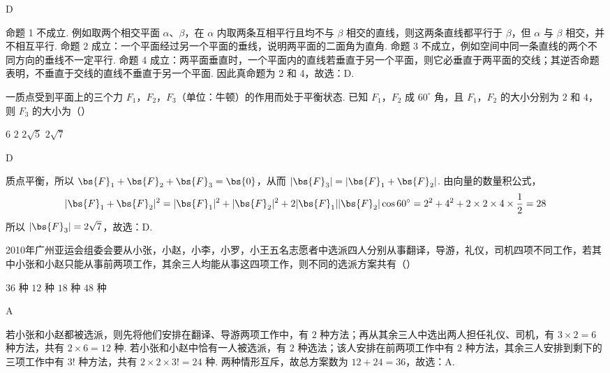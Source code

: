 \begin{answer}
D
\end{answer}

\begin{solution}
命题 1 不成立. 例如取两个相交平面 \(\alpha\)、\(\beta\)，在 \(\alpha\) 内取两条互相平行且均不与 \(\beta\) 相交的直线，则这两条直线都平行于 \(\beta\)，但 \(\alpha\) 与 \(\beta\) 相交，并不相互平行. 命题 2 成立：一个平面经过另一个平面的垂线，说明两平面的二面角为直角. 命题 3 不成立，例如空间中同一条直线的两个不同方向的垂线不一定平行. 命题 4 成立：两平面垂直时，一个平面内的直线若垂直于另一个平面，则它必垂直于两平面的交线；其逆否命题表明，不垂直于交线的直线不垂直于另一个平面. 因此真命题为 2 和 4，故选：D.
\end{solution}

\begin{problem}
一质点受到平面上的三个力 \(F_1\)，\(F_2\)，\(F_3\)（单位：牛顿）的作用而处于平衡状态. 已知 \(F_1\)，\(F_2\) 成 \(60^{\circ}\) 角，且 \(F_1\)，\(F_2\) 的大小分别为 \(2\) 和 \(4\)，则 \(F_3\) 的大小为（\quad）

\choices
    {\(6\)}
    {\(2\)}
    {\(2\sqrt{5}\)}
    {\(2\sqrt{7}\)}
\end{problem}

\begin{answer}
D
\end{answer}

\begin{solution}
质点平衡，所以 \(\bs{F}_1+\bs{F}_2+\bs{F}_3=\bs{0}\)，从而 \(|\bs{F}_3|=|\bs{F}_1+\bs{F}_2|\). 由向量的数量积公式，
\[
|\bs{F}_1+\bs{F}_2|^2=|\bs{F}_1|^2+|\bs{F}_2|^2+2|\bs{F}_1||\bs{F}_2|\cos60^{\circ}=2^2+4^2+2\times2\times4\times\frac12=28
\]
所以 \(|\bs{F}_3|=2\sqrt7\)，故选：D.
\end{solution}

\begin{problem}
2010年广州亚运会组委会要从小张，小赵，小李，小罗，小王五名志愿者中选派四人分别从事翻译，导游，礼仪，司机四项不同工作，若其中小张和小赵只能从事前两项工作，其余三人均能从事这四项工作，则不同的选派方案共有（\quad）

\choices
    {\(36\text{ 种}\)}
    {\(12\text{ 种}\)}
    {\(18\text{ 种}\)}
    {\(48\text{ 种}\)}
\end{problem}

\begin{answer}
A
\end{answer}

\begin{solution}
若小张和小赵都被选派，则先将他们安排在翻译、导游两项工作中，有 \(2\) 种方法；再从其余三人中选出两人担任礼仪、司机，有 \(3\times2=6\) 种方法，共有 \(2\times6=12\) 种. 若小张和小赵中恰有一人被选派，有 \(2\) 种选法；该人安排在前两项工作中有 \(2\) 种方法，其余三人安排到剩下的三项工作中有 \(3!\) 种方法，共有 \(2\times2\times3!=24\) 种. 两种情形互斥，故总方案数为 \(12+24=36\)，故选：A.
\end{solution}

